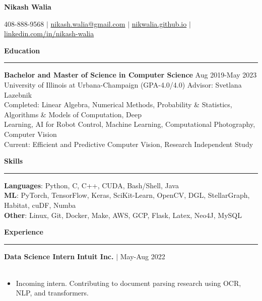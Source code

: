 \documentclass{cv}
\newcommand*{\labelfont}{\fontfamily{bch}\selectfont}
\begin{document}
\begin{center}
    {\LARGE \textbf{Nikash Walia} \par}
    \vspace{5pt}
    408-888-9568 $|$ \href{mailto:nikash.walia@gmail.com}{nikash.walia@gmail.com} $|$ \href{nikwalia.github.io}{nikwalia.github.io} $|$ \href{linkedin.com/in/nikash-walia}{linkedin.com/in/nikash-walia}
\end{center}\vspace*{-5pt}

{\large {\textbf{Education}}}\vspace*{-6pt}\\
\rule{\textwidth}{0.4pt}
{\labelfont \textbf{Bachelor and Master of Science in Computer Science} \hspace{6cm} Aug 2019-May 2023}\\
{\small University of Illinois at Urbana-Champaign (GPA-4.0/4.0) \hspace{5.5cm} Advisor: Svetlana Lazebnik\\
Completed: \hspace{0.5cm} Linear Algebra, Numerical Methods, Probability \& Statistics, Algorithms \& Models of Computation, Deep \\\hspace*{2.55cm}Learning, AI for Robot Control, Machine Learning, Computational Photography, Computer Vision\\
Current: \hspace{0.95cm} Efficient and Predictive Computer Vision, Research Independent Study}

\vspace*{5pt}
{\large {\textbf{Skills}}}\vspace*{-6pt}\\
\rule{\textwidth}{0.4pt}
{
{\labelfont \textbf{Languages}}: Python, C, C++, CUDA, Bash/Shell, Java\\
{\labelfont \textbf{ML}}: PyTorch, TensorFlow, Keras, SciKit-Learn, OpenCV, DGL, StellarGraph, Habitat, cuDF, Numba\\
{\labelfont \textbf{Other}}: Linux, Git, Docker, Make, AWS, GCP, Flask, Latex, Neo4J, MySQL
}

\vspace*{5pt}
{\large {\textbf{Experience}}}\vspace*{-6pt}\\
\rule{\textwidth}{0.4pt}

{\labelfont \textbf{Data Science Intern} \hspace*{10.6cm} \textbf{Intuit Inc.} $|$ May-Aug 2022}\\
\vspace{-25pt}\\
{
\small
\begin{itemize}
    \item Incoming intern. Contributing to document parsing research using OCR, NLP, and transformers.
\end{itemize}
}
\end{document}
